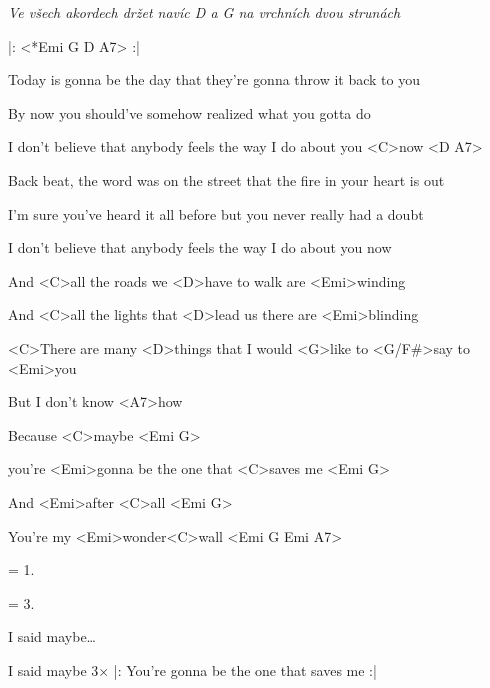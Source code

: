 

{\sl Ve všech akordech držet navíc D a G na vrchních dvou strunách}

|: <*Emi G D A7> :|

\zs
Today is gonna be the day that they're gonna throw it back to you

By now you should've somehow realized what you gotta do

I don't believe that anybody feels the way I do about you <C>now <D A7>
\ks

\zs
Back beat, the word was on the street that the fire in your heart is out

I'm sure you've heard it all before but you never really had a doubt

I don't believe that anybody feels the way I do about you now
\ks

\hvezda
And <C>all the roads we <D>have to walk are <Emi>winding

And <C>all the lights that <D>lead us there are <Emi>blinding

<C>There are many <D>things that I would <G>like to <G/F#>say to <Emi>you

But I don't know <A7>how
\ks

\zr
Because <C>maybe <Emi G>

you're <Emi>gonna be the one that <C>saves me <Emi G>

And <Emi>after <C>all <Emi G>

You're my <Emi>wonder<C>wall <Emi G Emi A7>
\kr

\zs
= 1.
\ks

\zs
= 3.
\ks

\zr
I said maybe…
\kr

\zr
I said maybe
3× |: You're gonna be the one that saves me :|
\kr

\kp
